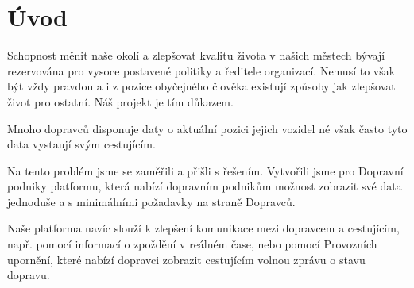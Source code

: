 \chapter{Úvod}

Schopnost měnit naše okolí a zlepšovat kvalitu života v našich městech bývají rezervována pro vysoce postavené politiky a ředitele organizací. Nemusí to však být vždy pravdou a i z pozice obyčejného člověka existují způsoby jak zlepšovat život pro ostatní.
Náš projekt je tím důkazem.

Mnoho dopravců disponuje daty o aktuální pozici jejich vozidel né však často tyto data vystaují svým cestujícím.

Na tento problém jsme se zaměřili a přišli s řešením. Vytvořili jsme pro Dopravní podniky platformu, která nabízí dopravním podnikům možnost zobrazit své data jednoduše a s  minimálními požadavky na straně Dopravců.

Naše platforma navíc slouží k zlepšení komunikace mezi dopravcem a cestujícím, např. pomocí informací o zpoždění v reálném čase, nebo pomocí Provozních upornění, které nabízí dopravci zobrazit cestujícím volnou zprávu o stavu dopravu.